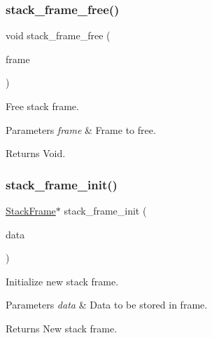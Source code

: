 \subsubsection{\texorpdfstring{stack\+\_\+frame\+\_\+free()}{stack\_frame\_free()}}
{\footnotesize\ttfamily void stack\+\_\+frame\+\_\+free (\begin{DoxyParamCaption}\item[{\hyperlink{structStackFrame}{Stack\+Frame} $\ast$$\ast$}]{frame }\end{DoxyParamCaption})}



Free stack frame. 


\begin{DoxyParams}{Parameters}
{\em frame} & Frame to free. \\
\hline
\end{DoxyParams}
\begin{DoxyReturn}{Returns}
Void. 
\end{DoxyReturn}
\mbox{\label{group__StackFrame_ga2ecf08ec1545d0db09d8558460770c53}} 
\subsubsection{\texorpdfstring{stack\+\_\+frame\+\_\+init()}{stack\_frame\_init()}}
{\footnotesize\ttfamily \hyperlink{structStackFrame}{Stack\+Frame}$\ast$ stack\+\_\+frame\+\_\+init (\begin{DoxyParamCaption}\item[{void $\ast$}]{data }\end{DoxyParamCaption})}



Initialize new stack frame. 


\begin{DoxyParams}{Parameters}
{\em data} & Data to be stored in frame. \\
\hline
\end{DoxyParams}
\begin{DoxyReturn}{Returns}
New stack frame. 
\end{DoxyReturn}
